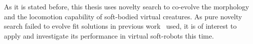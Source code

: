 As it is stated before, this thesis uses novelty search to co-evolve the morphology and the locomotion capability of soft-bodied virtual creatures. As pure novelty search failed to evolve fit solutions in previous work~\citep{lehman2011evolving} used, it is of interest to apply and investigate its performance in virtual soft-robots this time.

